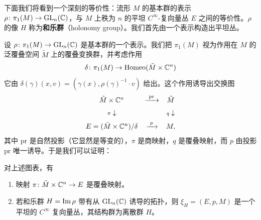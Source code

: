 下面我们将看到一个深刻的等价性：流形 $M$ 的基本群的表示 $\rho\colon\pi_1(M)\to\operatorname{GL}_n(\mathbb{C})$，与 $M$ 上秩为 $n$ 的平坦 $C^\infty$-复向量丛 $E$ 之间的等价性。$\rho$ 的像 $H$ 称为\textbf{和乐群}（holonomy group）。我们首先由一个表示构造出平坦丛。

设 $\rho\colon\pi_1(M)\to\operatorname{GL}_n(\mathbb{C})$ 是基本群的一个表示。我们把 $\pi_1(M)$ 视为作用在 $M$ 的泛覆叠空间 $\tilde M$ 上的覆叠变换群，并考虑作用
\[
\delta\colon \pi_1(M)\to\operatorname{Homeo}(\tilde M\times\mathbb{C}^n)
\]
它由 $\delta(\gamma)(x,v)=(\gamma(x),\rho(\gamma)^{-1}\cdot v)$ 给出。这个作用诱导出交换图
\[
\begin{array}{ccc}
\tilde M\times\mathbb{C}^n & \xrightarrow{\ \mathrm{pr}\ } & \tilde M\\[6pt]
{\scriptstyle \pi}\downarrow & & {\scriptstyle q}\downarrow\\[6pt]
E=(\tilde M\times\mathbb{C}^n)/\delta & \xrightarrow{\ p\ } & M ,
\end{array}
\]
其中 $\mathrm{pr}$ 是自然投影（它显然是等变的），$\pi$ 是商映射，$q$ 是覆叠映射，而 $p$ 由投影 $\mathrm{pr}$ 唯一诱导。于是我们可以证明：

\begin{proposition}[3.24]
对上述图表，有
\begin{enumerate}[label=\arabic*.]
\item 映射 $\pi\colon\tilde M\times\mathbb{C}^n\to E$ 是覆叠映射。
\item 若和乐群 $H=\operatorname{Im}\rho$ 带有从 $\operatorname{GL}_n(\mathbb{C})$ 诱导的拓扑，则 $\xi_H=(E,p,M)$ 是一个平坦的 $C^\infty$ 复向量丛，其结构群为离散群 $H$。
\end{enumerate}
\end{proposition}

